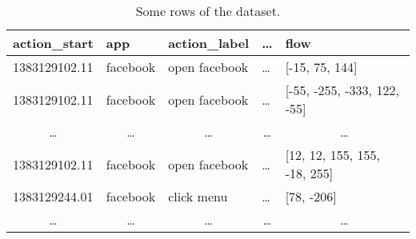 \begin{table}[]
\label{tab:origdataset}
\begin{tabular}{@{}lllll@{}}
\toprule
\textbf{action\_start}      & \textbf{app}               & \textbf{action\_label}     & \textbf{\dots}             & \textbf{flow}                \\ \midrule
1383129102.11              & facebook                   & open facebook              & \dots                      & [-15, 75, 144]               \\
1383129102.11              & facebook                   & open facebook              & \dots                      & [-55, -255, -333, 122, -55]  \\
\multicolumn{1}{c}{\dots} & \multicolumn{1}{c}{\dots} & \multicolumn{1}{c}{\dots} & \multicolumn{1}{c}{\dots} & \multicolumn{1}{c}{\dots}   \\
1383129102.11              & facebook                   & open facebook              & \dots                      & [12, 12, 155, 155, -18, 255] \\
1383129244.01              & facebook                   & click menu                 & \dots                      & [78, -206]                   \\
\multicolumn{1}{c}{\dots} & \multicolumn{1}{c}{\dots} & \multicolumn{1}{c}{\dots} & \multicolumn{1}{c}{\dots} & \multicolumn{1}{c}{\dots}   \\ \bottomrule
\end{tabular}
\caption{\small{Some rows of the dataset.}}
\end{table}
